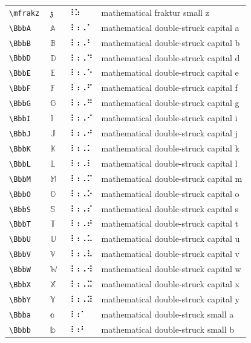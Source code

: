 \documentclass[oneside]{article}
\begin{document}
\begin{longtable}{llll}
\verb|\mfrakz| & $\mfrakz$ &  ⠸⠵  & {mathematical fraktur small z} \\[2ex]
\verb|\BbbA| & $\BbbA$ &  ⠸⠰⠠⠁  & {mathematical double-struck capital a} \\[2ex]
\verb|\BbbB| & $\BbbB$ &  ⠸⠰⠠⠃  & {mathematical double-struck capital b} \\[2ex]
\verb|\BbbD| & $\BbbD$ &  ⠸⠰⠠⠙  & {mathematical double-struck capital d} \\[2ex]
\verb|\BbbE| & $\BbbE$ &  ⠸⠰⠠⠑  & {mathematical double-struck capital e} \\[2ex]
\verb|\BbbF| & $\BbbF$ &  ⠸⠰⠠⠋  & {mathematical double-struck capital f} \\[2ex]
\verb|\BbbG| & $\BbbG$ &  ⠸⠰⠠⠛  & {mathematical double-struck capital g} \\[2ex]
\verb|\BbbI| & $\BbbI$ &  ⠸⠰⠠⠊  & {mathematical double-struck capital i} \\[2ex]
\verb|\BbbJ| & $\BbbJ$ &  ⠸⠰⠠⠚  & {mathematical double-struck capital j} \\[2ex]
\verb|\BbbK| & $\BbbK$ &  ⠸⠰⠠⠅  & {mathematical double-struck capital k} \\[2ex]
\verb|\BbbL| & $\BbbL$ &  ⠸⠰⠠⠇  & {mathematical double-struck capital l} \\[2ex]
\verb|\BbbM| & $\BbbM$ &  ⠸⠰⠠⠍  & {mathematical double-struck capital m} \\[2ex]
\verb|\BbbO| & $\BbbO$ &  ⠸⠰⠠⠕  & {mathematical double-struck capital o} \\[2ex]
\verb|\BbbS| & $\BbbS$ &  ⠸⠰⠠⠎  & {mathematical double-struck capital s} \\[2ex]
\verb|\BbbT| & $\BbbT$ &  ⠸⠰⠠⠞  & {mathematical double-struck capital t} \\[2ex]
\verb|\BbbU| & $\BbbU$ &  ⠸⠰⠠⠥  & {mathematical double-struck capital u} \\[2ex]
\verb|\BbbV| & $\BbbV$ &  ⠸⠰⠠⠧  & {mathematical double-struck capital v} \\[2ex]
\verb|\BbbW| & $\BbbW$ &  ⠸⠰⠠⠺  & {mathematical double-struck capital w} \\[2ex]
\verb|\BbbX| & $\BbbX$ &  ⠸⠰⠠⠭  & {mathematical double-struck capital x} \\[2ex]
\verb|\BbbY| & $\BbbY$ &  ⠸⠰⠠⠽  & {mathematical double-struck capital y} \\[2ex]
\verb|\Bbba| & $\Bbba$ &  ⠸⠰⠁  & {mathematical double-struck small a} \\[2ex]
\verb|\Bbbb| & $\Bbbb$ &  ⠸⠰⠃  & {mathematical double-struck small b} \\[2ex]

\end{longtable}
\end{document}
